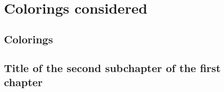 \chapter{Colorings considered}

\section{Colorings}



\section{Title of the second subchapter of the first chapter}
